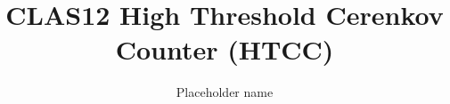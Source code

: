 \title{CLAS12 High Threshold Cerenkov Counter (HTCC)}

\author[A]{Placeholder name}
\begin{comment}
	\author[A]{M. A.~Antonioli}
	\author[A]{N.~Baltzell}
	\author[A]{S.~Boiarinov}
	\author[A]{P.~Bonneau}
	\author[A]{S.~Christo}
	\author[A]{C.~Cuevas}
	\author[B]{G.~Derylo}
	\author[A]{L.~Elouadrhiri}
	\author[A]{B.~Eng}
	\author[A]{T.~Ewing}
	\author[A]{Y.~Gotra}
	\author[A]{M.~Leffel}
	\author[A]{S.~Mandal}
	\author[A]{B.~Marzolf}
	\author[A]{M.~McMullen}
	\author[C]{M.~Merkin}
	\author[A]{R.~Miller}
	\author[A]{B.~Raydo}
	\author[A]{W.~Teachey}
	\author[D]{R.~Tucker}
	\author[A]{M.~Ungaro}
	\author[A]{A.~Yegneswaran}
	\author[A]{V.~Ziegler}
\end{comment}

\address[A]{Placeholder location}
\begin{comment}
	\address[A]{Thomas Jefferson National Accelerator Facility, Newport News, VA, USA}
	\address[B]{Fermi National Accelerator Laboratory, Batavia, IL, USA}
	\address[C]{Skobeltsyn Institute of Nuclear Physics, Moscow State University, Moscow, Russia}
	\address[D]{Arizona State University, Tempe, AZ}
\end{comment}


